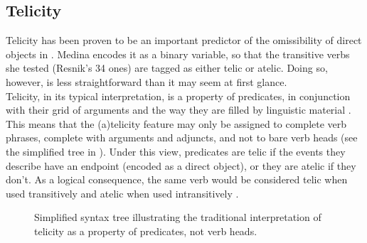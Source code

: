 \subsection{Telicity} 
Telicity has been proven to be an important predictor of the omissibility of direct objects in . Medina encodes it as a binary variable, so that the transitive verbs she tested (Resnik's 34 ones) are tagged as either telic or atelic. Doing so, however, is less straightforward than it may seem at first glance.\\
Telicity, in its typical interpretation, is a property of predicates, in conjunction with their grid of arguments and the way they are filled by linguistic material \parencite{Vendler1957, dowty2012word1979}. This means that the (a)telicity feature may only be assigned to complete verb phrases, complete with arguments and adjuncts, and not to bare verb heads (see the simplified tree in ). Under this view, predicates are telic if the events they describe have an endpoint (encoded as a direct object), or they are atelic if they don't. As a logical consequence, the same verb would be considered telic when used transitively and atelic when used intransitively \parencite{OlsenResnik1997, Mittwoch1982}.

\begin{figure}[htb]
\caption{Simplified syntax tree illustrating the traditional interpretation of telicity as a property of predicates, not verb heads.}
\end{figure}

